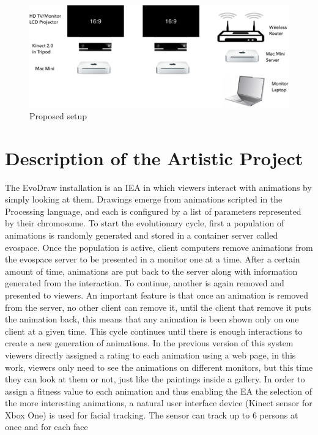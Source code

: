 \documentclass[letterpaper]{article}
\begin{document}
\label{Description}
\begin{figure}[!t]
\centering
\includegraphics[width=6in]{EvoDrawTech.pdf}
\caption{Proposed setup}
\label{fig:system}
\end{figure}

\section{Description of the Artistic Project} 
The EvoDraw installation is an IEA in which viewers interact with animations by simply
looking at them. Drawings emerge from animations scripted in the Processing 
language, and each is configured by a list of parameters represented by their
chromosome. To start the evolutionary cycle, first a population of animations is 
randomly generated and stored in a container server called evospace. Once the population is active, 
client computers remove animations from the evospace server to be presented in a monitor
one at a time. After a certain amount of time, animations are put back to the server along 
with information generated from the interaction. To continue, another is again removed and presented
to viewers. An important feature is that once an animation is removed from the server,
no other client can remove it, until the client that remove it puts the animation back, this means that any
animation is been shown only
on one client at a given time. This cycle continues until there is enough interactions to create a new
generation of animations. In the previous version of this system \citep{garcia2013evospace} 
viewers directly assigned a rating to each animation using a web page, in this work, viewers
only need to see the animations on different monitors, but this time they can look at them or not, just like
the paintings inside a gallery. In order to assign a fitness value to each animation and thus 
enabling the EA the selection of the more interesting animations, 
a natural user interface device (Kinect sensor for Xbox One)
is used for facial tracking. The sensor can track up to 6 persons at once and for each face 
\end{document}
